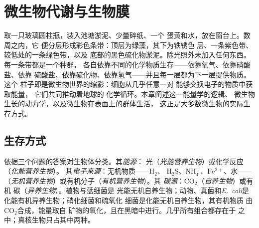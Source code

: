 \chapter{微生物代谢与生物膜}\label{ch:b2:microbial-metabolism}

取一只玻璃圆柱瓶，装入池塘淤泥、少量碎纸、一个
蛋黄和水，放在窗台上。数周之内，它
便分层形成彩色条带：顶层为绿藻，其下为铁锈色
层、一条紫色带、较低处的一条绿色带，以及
底部的黑色硫化物淤泥。除光照外未加入任何东西。每一条带都是一个种群，
各自依靠不同的化学物质生存——依靠氧气、依靠硝酸盐、依靠
硫酸盐、依靠硫化物、依靠氢气——并且每一层都为下一层提供物质。这个
柱子即是微生物世界的缩影：细胞从几乎任意一对
能够交换电子的物质中获取能量，
它们共同推动着地球的
化学循环。本章阐述这一能量学的逻辑、
微生物生长的动力学，以及微生物在表面上的群体生活，
这正是大多数微生物的实际生存方式。

\section{生存方式}

\begin{definition}[营养类型]\label{def:b2:microbial-metabolism:trophic}
依据三个问题的答案对生物体分类。其\emph{能源}：
光（\emph{光能营养生物}）或化学反应（\emph{化能营养生物}）。
其\emph{电子来源}：无机物质——$\mathrm{H_2}$、
$\mathrm{H_2S}$、$\mathrm{NH_4^+}$、$\mathrm{Fe^{2+}}$、水——
（\emph{无机营养生物}）或有机分子（\emph{有机营养生物}）。其
\emph{碳源}：$\mathrm{CO_2}$（\emph{自养生物}）或有机
碳（\emph{异养生物}）。植物与蓝细菌是
光能无机自养生物；动物、真菌和\emph{E.~coli}是
化能有机异养生物；硝化细菌和硫氧化
细菌是化能无机自养生物，其有机物质
由$\mathrm{CO_2}$合成，能量取自
矿物的氧化，且在黑暗中进行。几乎所有组合都存在于
之中；真核生物只占其中两种。
\end{definition}

